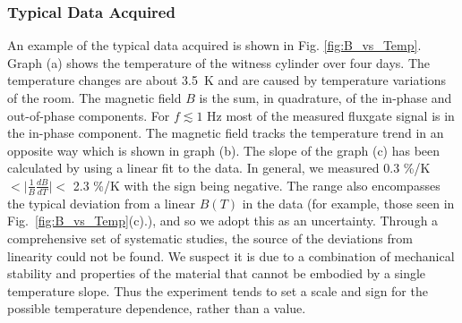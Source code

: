 \subsubsection{Typical Data Acquired}

An example of the typical data acquired is shown in
Fig. \ref{fig:B_vs_Temp}. Graph (a) shows the temperature of the
witness cylinder over four days. The temperature changes are about
3.5~K and are caused by temperature variations of the room. The
magnetic field $B$ is the sum, in quadrature, of the in-phase and
out-of-phase components. For $f\lesssim 1$ Hz most of the measured
fluxgate signal is in the in-phase component. The magnetic field
tracks the temperature trend in an opposite way which is shown in
graph (b). The slope of the graph (c) has been calculated by using a
linear fit to the data. In general, we measured 0.3 \%/K $< \vert
\frac{1}{B} \frac{dB}{dT} \vert <$ 2.3 \%/K with the sign being
negative. The range also encompasses the typical deviation from a
linear $B(T)$ in the data (for example, those seen in
Fig.~\ref{fig:B_vs_Temp}(c).), and so we adopt this as an
uncertainty. Through a comprehensive set of systematic studies, the
source of the deviations from linearity could not be found. We suspect
it is due to a combination of mechanical stability and properties of
the material that cannot be embodied by a single temperature
slope. Thus the experiment tends to set a scale and sign for the
possible temperature dependence, rather than a value.
